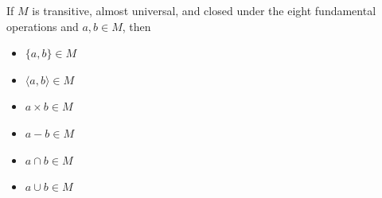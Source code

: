 If $M$ is transitive, almost universal, and closed under the eight fundamental operations and $a, b \in M$, then
\begin{itemize}
\item[(1)] $\{a, b\} \in M$
\item[(2)] $\langle a, b \rangle \in M$
\item[(3)] $a \times b \in M$
\item[(4)] $a - b \in M$
\item[(5)] $a \cap b \in M$
\item[(6)] $a \cup b \in M$
\end{itemize}
